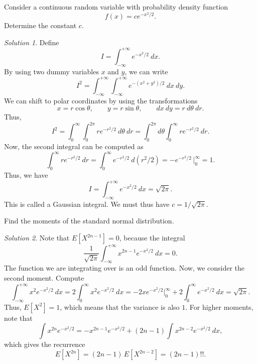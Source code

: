 \documentclass[11pt]{article}
\newcommand\E[1]{E[#1]}
\theoremstyle{definition}
\theoremstyle{remark}
\newtheorem*{solution}{Solution}
\numberwithin{equation}{module}
\begin{document}
    \begin{exercise}
        Consider a continuous random variable with probability density function \[
            f(x) = c e^{-x^2 /2}.
        \] Determine the constant $c$.
        \begin{solution}
            Define \[
                I = \int_{-\infty}^{+\infty} e^{-x^2 /2} \:dx.
            \] By using two dummy variables $x$ and $y$, we can write \[
                I^2 = \int_{-\infty}^{+\infty} \int_{-\infty}^{+\infty} e^{-(x^2 +
                y^2) / 2}\:dx\:dy.
            \] We can shift to polar coordinates by using the transformations \[
                x = r\cos\theta, \qquad y = r\sin\theta, \qquad dx\:dy =
                r\:d\theta\:dr.
            \] Thus, \[
                I^2 = \int_{0}^\infty \int_{0}^{2\pi} re^{-r^2 / 2}\:d\theta\:dr =
                \int_0^{2\pi} d\theta \int_0^\infty re^{-r^2 / 2}\:dr.
            \] Now, the second integral can be computed as \[
                \int_0^\infty re^{-r^2 / 2}\:dr = \int_0^\infty e^{-r^2 / 2} \:d(r^2
                / 2) = -e^{-r^2 / 2}\,\Big|_0^\infty = 1.
            \] Thus, we have \[
                I = \int_{-\infty}^{+\infty} e^{-x^2 / 2} \:dx = \sqrt{2\pi}.
            \] This is called a Gaussian integral. We must thus have $c = 1
            /\sqrt{2\pi}$.
        \end{solution}
    \end{exercise}

    \begin{exercise}
        Find the moments of the standard normal distribution.
        \begin{solution}
            Note that $\E{X^{2n - 1}} = 0$, because the integral \[
                \frac{1}{\sqrt{2\pi}}\int_{-\infty}^{+\infty} x^{2n - 1}e^{-x^2 /
                2}\:dx = 0.
            \] The function we are integrating over is an odd function. Now, we
            consider the second moment. Compute \[
                \int_{-\infty}^{+\infty} x^2 e^{-x^2 / 2}\:dx = 2 \int_0^\infty x^2
                e^{-x^2 / 2}\:dx = -2xe^{-x^2 / 2}\Big|_0^\infty + 2\int_0^\infty
                e^{-x^2 / 2}\:dx = \sqrt{2\pi}.
            \] Thus, $\E{X^2} = 1$, which means that the variance is also $1$. For
            higher moments, note that \[
                \int x^{2n}e^{-x^2 / 2} = -x^{2n - 1}e^{-x^2 / 2} + (2n - 1)
                \int x^{2n - 2} e^{-x^2 / 2}\:dx,
            \] which gives the recurrence \[
                \E{X^{2n}} = (2n - 1)\, \E{X^{2n - 2}} = (2n - 1)!!.
            \] 
        \end{solution}
    \end{exercise}
\end{document}
